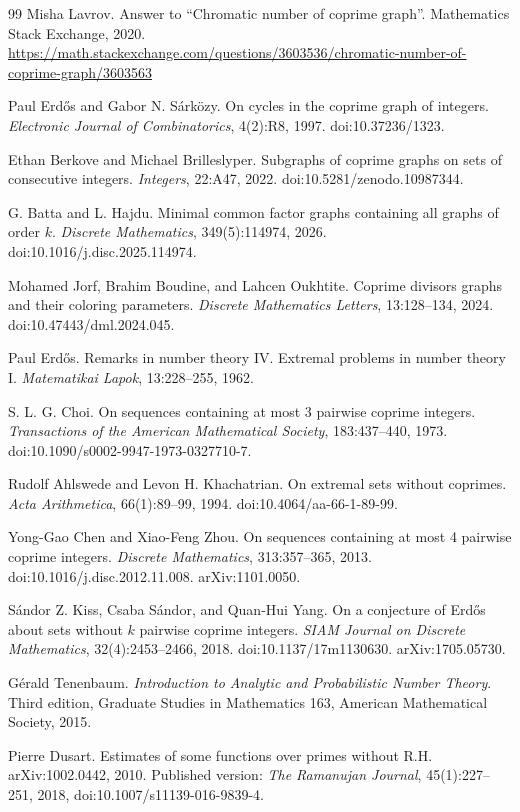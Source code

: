 \documentclass[11pt]{article}
\theoremstyle{plain}
\theoremstyle{definition}
\theoremstyle{remark}
\begin{document}
\begin{thebibliography}{99}
Misha Lavrov.
\newblock Answer to ``Chromatic number of coprime graph''.
\newblock Mathematics Stack Exchange, 2020.
\newblock \url{https://math.stackexchange.com/questions/3603536/chromatic-number-of-coprime-graph/3603563}

Paul Erd\H{o}s and Gabor N. S\'ark\"ozy.
\newblock On cycles in the coprime graph of integers.
\newblock \emph{Electronic Journal of Combinatorics}, 4(2):R8, 1997.
\newblock doi:10.37236/1323.

Ethan Berkove and Michael Brilleslyper.
\newblock Subgraphs of coprime graphs on sets of consecutive integers.
\newblock \emph{Integers}, 22:A47, 2022.
\newblock doi:10.5281/zenodo.10987344.

G. Batta and L. Hajdu.
\newblock Minimal common factor graphs containing all graphs of order $k$.
\newblock \emph{Discrete Mathematics}, 349(5):114974, 2026.
\newblock doi:10.1016/j.disc.2025.114974.

Mohamed Jorf, Brahim Boudine, and Lahcen Oukhtite.
\newblock Coprime divisors graphs and their coloring parameters.
\newblock \emph{Discrete Mathematics Letters}, 13:128--134, 2024.
\newblock doi:10.47443/dml.2024.045.

Paul Erd\H{o}s.
\newblock Remarks in number theory IV. Extremal problems in number theory I.
\newblock \emph{Matematikai Lapok}, 13:228--255, 1962.

S. L. G. Choi.
\newblock On sequences containing at most 3 pairwise coprime integers.
\newblock \emph{Transactions of the American Mathematical Society},
183:437--440, 1973.
\newblock doi:10.1090/s0002-9947-1973-0327710-7.

Rudolf Ahlswede and Levon H. Khachatrian.
\newblock On extremal sets without coprimes.
\newblock \emph{Acta Arithmetica}, 66(1):89--99, 1994.
\newblock doi:10.4064/aa-66-1-89-99.

Yong-Gao Chen and Xiao-Feng Zhou.
\newblock On sequences containing at most 4 pairwise coprime integers.
\newblock \emph{Discrete Mathematics}, 313:357--365, 2013.
\newblock doi:10.1016/j.disc.2012.11.008.  arXiv:1101.0050.

S\'andor Z. Kiss, Csaba S\'andor, and Quan-Hui Yang.
\newblock On a conjecture of Erd\H{o}s about sets without $k$ pairwise coprime
integers.
\newblock \emph{SIAM Journal on Discrete Mathematics}, 32(4):2453--2466,
2018.
\newblock doi:10.1137/17m1130630.  arXiv:1705.05730.

G\'erald Tenenbaum.
\newblock \emph{Introduction to Analytic and Probabilistic Number Theory}.
\newblock Third edition, Graduate Studies in Mathematics 163, American
Mathematical Society, 2015.

Pierre Dusart.
\newblock Estimates of some functions over primes without R.H.
\newblock arXiv:1002.0442, 2010.
\newblock Published version: \emph{The Ramanujan Journal}, 45(1):227--251,
2018, doi:10.1007/s11139-016-9839-4.

\end{thebibliography}
\end{document}
